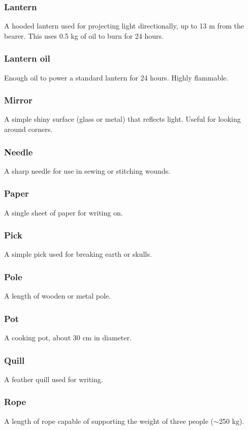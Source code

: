 \subsubsection*{Lantern}
A hooded lantern used for projecting  light directionally, up to 13 m from the bearer. This uses 0.5 kg of oil to burn for 24 hours.

\subsubsection*{Lantern oil}
Enough oil to power a standard lantern for 24 hours. Highly flammable.

\subsubsection*{Mirror}
A simple shiny surface (glass or metal) that reflects light. Useful for looking around corners.

\subsubsection*{Needle}
A sharp needle for use in sewing or stitching wounds.

\subsubsection*{Paper}
A single sheet of paper for writing on.

\subsubsection*{Pick}
A simple pick used for breaking earth or skulls.

\subsubsection*{Pole}
A length of wooden or metal pole.

\subsubsection*{Pot}
A cooking pot, about 30 cm in diameter.

\subsubsection*{Quill}
A feather quill used for writing.

\subsubsection*{Rope}
A length of rope capable of supporting the weight of three people ($\sim$250 kg).

